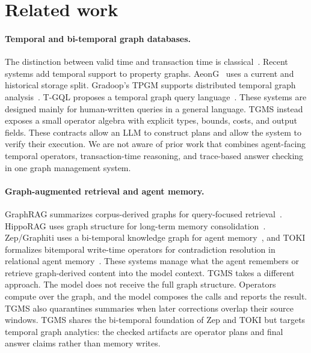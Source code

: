 \documentclass[11pt]{article}
\begin{document}
\section{Related work}

\paragraph{Temporal and bi-temporal graph databases.}
The distinction between valid time and transaction time is
classical~\cite{snodgrass1999}. Recent systems add temporal support to
property graphs. AeonG~\cite{aeong2024} uses a current and historical
storage split. Gradoop's TPGM supports distributed temporal graph
analysis~\cite{rost2022gradoop}. T-GQL proposes a temporal graph query
language~\cite{debrouvier2021tgql}. These systems are designed mainly for
human-written queries in a general language. TGMS instead exposes a
small operator algebra with explicit types, bounds, costs, and output
fields. These contracts allow an LLM to construct plans and allow the
system to verify their execution. We are not aware of prior work that
combines agent-facing temporal operators, transaction-time reasoning,
and trace-based answer checking in one graph management system.

\paragraph{Graph-augmented retrieval and agent memory.}
GraphRAG summarizes corpus-derived graphs for query-focused
retrieval~\cite{edge2024graphrag}. HippoRAG uses graph structure for
long-term memory consolidation~\cite{gutierrez2024hipporag}.
Zep/Graphiti uses a bi-temporal knowledge graph for agent
memory~\cite{zep2025}, and TOKI formalizes bitemporal write-time
operators for contradiction resolution in relational agent
memory~\cite{wang2026toki}. These systems manage what the agent
remembers or retrieve graph-derived content into the model context. TGMS takes a different approach. The model does not
receive the full graph structure. Operators compute over the graph, and
the model composes the calls and reports the result. TGMS also
quarantines summaries when later corrections overlap their source
windows. TGMS shares the bi-temporal foundation of Zep and TOKI but
targets temporal graph analytics: the checked artifacts are operator
plans and final answer claims rather than memory writes.
\end{document}
